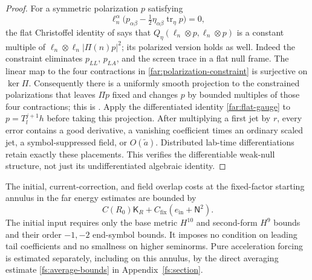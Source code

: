 \begin{proof}
For a symmetric polarization $p$ satisfying
\begin{equation}\label{far:polarization-constraint}
 \ell_n^\alpha\bigl(p_{\alpha\beta}
                  -\tfrac12\eta_{\alpha\beta}\operatorname{tr}_\eta p
              \bigr)=0,
\end{equation}
the flat Christoffel identity of  says that
$Q_\eta(\ell_n\otimes p,\ell_n\otimes p)$ is a constant multiple of
$\ell_n\otimes\ell_n|\Pi(n)p|^2$; its polarized version holds as well.
Indeed the constraint eliminates $p_{LL}$, $p_{LA}$, and the screen
trace in a flat null frame.  The linear map to the four contractions in
\eqref{far:polarization-constraint} is surjective on $\ker\Pi$.
Consequently there is a uniformly smooth projection to the constrained
polarizations that leaves $\Pi p$ fixed and changes $p$ by bounded
multiples of those four contractions; this is
.  Apply the differentiated identity
\eqref{far:flat-gauge} to $p=T_l^{j+1}h$ before taking this projection.
After multiplying a first jet by $r$, every error contains a good
derivative, a vanishing coefficient times an ordinary scaled jet, a
symbol-suppressed field, or $O(\widetilde a)$.  Distributed lab-time
differentiations retain exactly these placements.  This verifies the
differentiable weak-null structure, not just its undifferentiated
algebraic identity.
\end{proof}

\begin{lemma}\label{far:boundary-input}
The initial, current-correction, and field overlap costs at the
fixed-factor starting annulus in the far energy estimates are bounded by
\begin{equation}\label{far:overlap-bound}
 C(R_0)\mathsf K_R+C_{\mathrm{fix}}(e_{\mathrm{in}}+\mathsf N^2).
\end{equation}
The initial input requires only the base metric $H^{10}$ and second-form
$H^9$ bounds and their order $-1,-2$ end-symbol bounds.  It imposes no
condition on leading tail coefficients and no smallness on higher
seminorms.  Pure acceleration forcing is estimated separately, including
on this annulus, by the direct averaging estimate
\eqref{fs:average-bounds} in Appendix~\ref{fs:section}.
\end{lemma}


